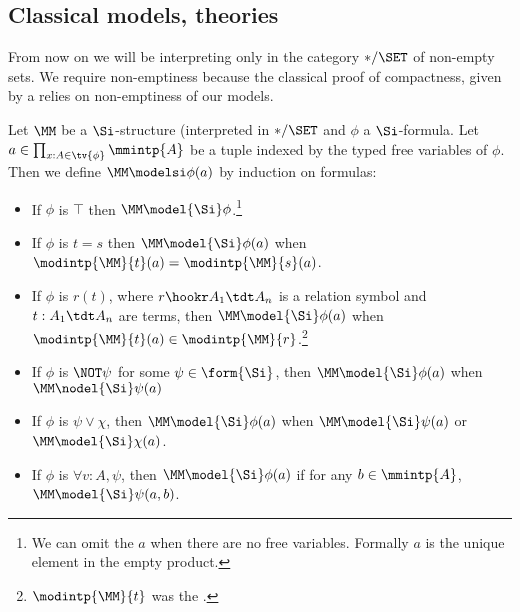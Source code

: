 \subsection{Classical models, theories}
From now on we will be interpreting only in the category $* / \SET$
of non-empty sets. 
We require non-emptiness because the classical proof of compactness,
given by a  
relies on non-emptiness of our models.

\begin{dfn}[Satisfaction]
    Let $\MM$ be a $\Si$-structure (interpreted in $* / \SET$ 
    and $\phi$ a $\Si$-formula. 
    Let $a \in \prod_{x : A \in \tv{\phi}} \mmintp{A}$ be a tuple indexed by 
    the typed free variables of $\phi$.
    Then we define $\MM \modelsi \phi(a)$ by induction on formulas:
    \begin{itemize}
        \item If $\phi$ is $\top$ then $\MM \model{\Si} \phi$.\footnote{
            We can omit the $a$ when there are no free variables.
            Formally $a$ is the unique element in the empty product.}
        \item If $\phi$ is $t = s$ then
            $\MM \model{\Si} \phi(a)$ when 
            $\modintp{\MM}{t}(a) = \modintp{\MM}{s}(a)$.
            \item If $\phi$ is $r(t)$, 
            where $r \hookr A_1 \tdt A_n$ is a relation symbol and  
            $t : A_1 \tdt A_n$ are terms,
            then $\MM \model{\Si} \phi(a)$ when 
            $\modintp{\MM}{t}(a) \in \modintp{\MM}{r}$.\footnote{
            $\modintp{\MM}{t}$ was the 
            .
            }
            \vspace{1em}
        \item If $\phi$ is 
            $\NOT\psi$ for some $\psi \in \form{\Si}$, 
            then $\MM \model{\Si} \phi(a)$ when $\MM \nodel{\Si} \psi(a)$
        \item If $\phi$ is  $\psi \lor \chi$, 
            then $\MM \model{\Si} \phi(a)$ when 
            $\MM \model{\Si} \psi(a)$ or $\MM \model{\Si} \chi(a)$.
        \item If $\phi$ is 
            $\forall v : A, \psi$,
            then $\MM \model{\Si} \phi(a)$ 
            if for any $b \in \mmintp{A}$,   
            $\MM \model{\Si} \psi(a,b)$.
    \end{itemize}
\end{dfn}

